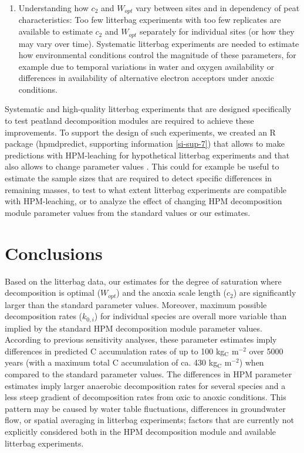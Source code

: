 \documentclass[esd, manuscript]{copernicus}
\begin{document}
\begin{enumerate}
\item
  Understanding how \(c_2\) and \(W_{opt}\) vary between sites and in dependency of peat characteristics: Too few litterbag experiments with too few replicates are available to estimate \(c_2\) and \(W_{opt}\) separately for individual sites (or how they may vary over time). Systematic litterbag experiments are needed to estimate how environmental conditions control the magnitude of these parameters, for example due to temporal variations in water and oxygen availability or differences in availability of alternative electron acceptors under anoxic conditions.
\end{enumerate}

Systematic and high-quality litterbag experiments that are designed specifically to test peatland decomposition modules are required to achieve these improvements. To support the design of such experiments, we created an R package (hpmdpredict, supporting information \ref{si-sup-7}) that allows to make predictions with HPM-leaching for hypothetical litterbag experiments and that also allows to change parameter values \citep{Teickner.2025b}. This could for example be useful to estimate the sample sizes that are required to detect specific differences in remaining masses, to test to what extent litterbag experiments are compatible with HPM-leaching, or to analyze the effect of changing HPM decomposition module parameter values from the standard values or our estimates.

\section{Conclusions}

Based on the litterbag data, our estimates for the degree of saturation where decomposition is optimal (\(W_{opt}\)) and the anoxia scale length (\(c_2\)) are significantly larger than the standard parameter values. Moreover, maximum possible decomposition rates (\(k_{0,i}\)) for individual species are overall more variable than implied by the standard HPM decomposition module parameter values. According to previous sensitivity analyses, these parameter estimates imply differences in predicted C accumulation rates of up to 100 kg\(_\text{C}\) m\(^{-2}\) over 5000 years (with a maximum total C accumulation of ca. 430 kg\(_\text{C}\) m\(^{-2}\)) when compared to the standard parameter values. The differences in HPM parameter estimates imply larger anaerobic decomposition rates for several species and a less steep gradient of decomposition rates from oxic to anoxic conditions. This pattern may be caused by water table fluctuations, differences in groundwater flow, or spatial averaging in litterbag experiments; factors that are currently not explicitly considered both in the HPM decomposition module and available litterbag experiments.
\end{document}
